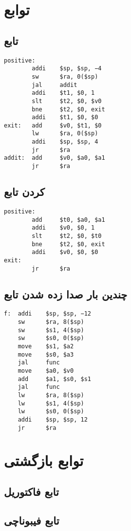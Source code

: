 \documentclass[11pt, dvipsnames, svgnames, x11names]{article}
\begin{document}
\section{توابع}
\subsection{تابع }
\begin{latin}
\begin{lstlisting}[keywords={addi, sw, jal, slt, bne, add, lw, jr}]
positive:
        addi    $sp, $sp, −4
        sw      $ra, 0($sp)
        jal     addit
        addi    $t1, $0, 1
        slt     $t2, $0, $v0
        bne     $t2, $0, exit
        addi    $t1, $0, $0
exit:   add     $v0, $t1, $0
        lw      $ra, 0($sp)
        addi    $sp, $sp, 4
        jr      $ra
addit:  add     $v0, $a0, $a1
        jr      $ra
\end{lstlisting}
\end{latin}
\subsection{ کردن تابع}
\begin{latin}
\begin{lstlisting}[keywords={add, addi, slt, bne, jr}]
positive:
        add     $t0, $a0, $a1
        addi    $v0, $0, 1
        slt     $t2, $0, $t0
        bne     $t2, $0, exit
        addi    $v0, $0, $0
exit:
        jr      $ra
\end{lstlisting}
\end{latin}
\subsection{چندین بار صدا زده شدن تابع}
\begin{latin}
\begin{lstlisting}[keywords={addi, sw, move, jal, add, lw, jr}]
f:  addi    $sp, $sp, −12
    sw      $ra, 8($sp)
    sw      $s1, 4($sp)
    sw      $s0, 0($sp)
    move    $s1, $a2
    move    $s0, $a3
    jal     func
    move    $a0, $v0
    add     $a1, $s0, $s1
    jal     func
    lw      $ra, 8($sp)
    lw      $s1, 4($sp)
    lw      $s0, 0($sp)
    addi    $sp, $sp, 12
    jr      $ra
\end{lstlisting}
\end{latin}
\section{توابع بازگشتی}

\subsection{تابع فاکتوریل}

\subsection{تابع فیبوناچی}
\end{document}
